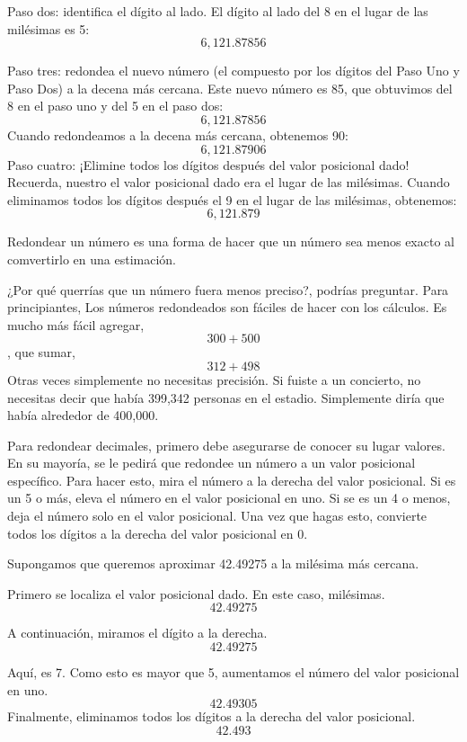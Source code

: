 \documentclass[12pt]{book}
\begin{document}
\begin{mainmatter}
    Paso dos: identifica el dígito al lado. El dígito al lado del 8 en el
    lugar de las milésimas es 5:
    \[6,121.87 \boxed{8} \boxed{5} 6\]

    Paso tres: redondea el nuevo número (el compuesto por los dígitos del Paso
    Uno y Paso Dos) a la decena más cercana. Este nuevo número es 85, que obtuvimos
    del 8 en el paso uno y del 5 en el paso dos:
    \[6,121.87 \boxed{85} 6\]
    Cuando redondeamos a la decena más cercana, obtenemos 90:
    \[6,121.87 \boxed{90} 6\]
    Paso cuatro: ¡Elimine todos los dígitos después del valor posicional dado! Recuerda, nuestro
    el valor posicional dado era el lugar de las milésimas. Cuando eliminamos todos los dígitos después
    el 9 en el lugar de las milésimas, obtenemos:
    \[6,121.879\]

    Redondear un número es una forma de hacer que un número sea menos exacto al comvertirlo
    en una estimación.

    ¿Por qué querrías que un número fuera menos preciso?, podrías preguntar. Para principiantes,
    Los números redondeados son fáciles de hacer con los cálculos. Es mucho más fácil agregar,
    \[300 + 500\],
    que sumar,
    \[312 + 498\]
    Otras veces simplemente no necesitas precisión. Si fuiste a un concierto, no necesitas decir que había 399,342 personas
    en el estadio. Simplemente diría que había alrededor de 400,000.

    Para redondear decimales, primero debe asegurarse de conocer su lugar valores. En su mayoría, se le pedirá que redondee un número a un valor posicional específico. Para hacer esto, mira el número a la derecha del valor posicional. Si es un 5 o más, eleva el número en el valor posicional en uno. Si se
    es un 4 o menos, deja el número solo en el valor posicional. Una vez que hagas esto,
    convierte todos los dígitos a la derecha del valor posicional en 0.

    Supongamos que queremos aproximar 42.49275 a la milésima más cercana.

    Primero se localiza el valor posicional dado. En este caso, milésimas.
    \[42.49\boxed{2} 75\]

    A continuación, miramos el dígito a la derecha.
    \[42.49\boxed{2} \boxed{7}5\]

    Aquí, es 7. Como esto es mayor que 5, aumentamos el número del valor posicional en uno.
    \[42.49\boxed{3} \boxed{0}5\]
    Finalmente, eliminamos todos los dígitos a la derecha del valor posicional.
    \[42.49\boxed{3} \]



\end{mainmatter}
\end{document}
